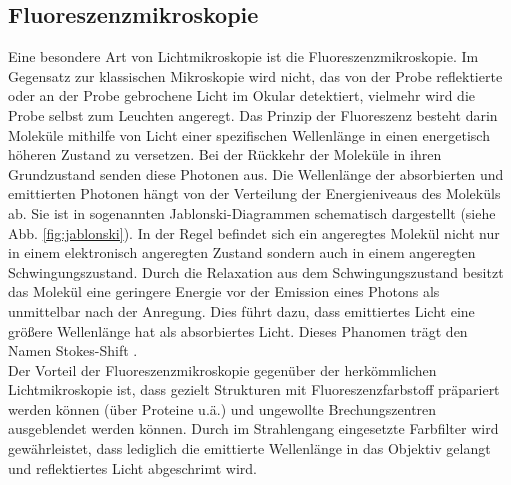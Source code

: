 \subsection{Fluoreszenzmikroskopie}
Eine besondere Art von Lichtmikroskopie ist die Fluoreszenzmikroskopie.
Im Gegensatz zur klassischen Mikroskopie wird nicht, das von der Probe reflektierte oder an der Probe gebrochene Licht im Okular detektiert, vielmehr wird die Probe selbst zum Leuchten angeregt.
Das Prinzip der Fluoreszenz besteht darin Moleküle mithilfe von Licht einer spezifischen Wellenlänge in einen energetisch höheren Zustand zu versetzen. 
Bei der Rückkehr der Moleküle in ihren Grundzustand senden diese Photonen aus. 
Die Wellenlänge der absorbierten und emittierten Photonen hängt von der Verteilung der Energieniveaus des Moleküls ab. Sie ist in sogenannten Jablonski-Diagrammen schematisch dargestellt (siehe Abb. \ref{fig:jablonski}).
In der Regel befindet sich ein angeregtes Molekül nicht nur in einem elektronisch angeregten Zustand sondern auch in einem angeregten Schwingungszustand.
Durch die Relaxation aus dem Schwingungszustand besitzt das Molekül eine geringere Energie vor der Emission eines Photons als unmittelbar nach der Anregung.
Dies führt dazu, dass emittiertes Licht eine größere Wellenlänge hat als absorbiertes Licht. Dieses Phanomen trägt den Namen Stokes-Shift \cite{haken}.
\\
Der Vorteil der Fluoreszenzmikroskopie gegenüber der herkömmlichen Lichtmikroskopie ist, dass gezielt Strukturen mit Fluoreszenzfarbstoff präpariert werden können (über Proteine u.ä.) und ungewollte Brechungszentren ausgeblendet werden können.
Durch im Strahlengang eingesetzte Farbfilter wird gewährleistet, dass lediglich die emittierte Wellenlänge in das Objektiv gelangt und reflektiertes Licht abgeschrimt wird.
